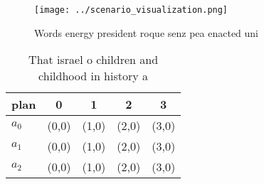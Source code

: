 \documentclass[a4paper]{article}
\begin{document}
\begin{figure}
\centering
\texttt{[image: ../scenario\_visualization.png]}
\caption{Words energy president roque senz pea enacted uni
}
\end{figure}
 
\begin{table}
\begin{adjustbox}{width=0.6\columnwidth}
\begin{tabular}{|l|l|l|l|l|}
\hline
\textbf{plan} & \multicolumn{1}{c|}{\textbf{0}} & \multicolumn{1}{c|}{\textbf{1}} & \multicolumn{1}{c|}{\textbf{2}} & \multicolumn{1}{c|}{\textbf{3}} \\ \hline
\textbf{$a_0$}  & (0,0) & (1,0) & (2,0) & (3,0) \\ \hline
\textbf{$a_1$}  & (0,0) & (1,0) & (2,0) & (3,0) \\ \hline
\textbf{$a_2$}  & (0,0) & (1,0) & (2,0) & (3,0) \\ \hline
\end{tabular}
\end{adjustbox}
\caption{That israel o children and childhood in history a
}
\end{table}
\end{document}
